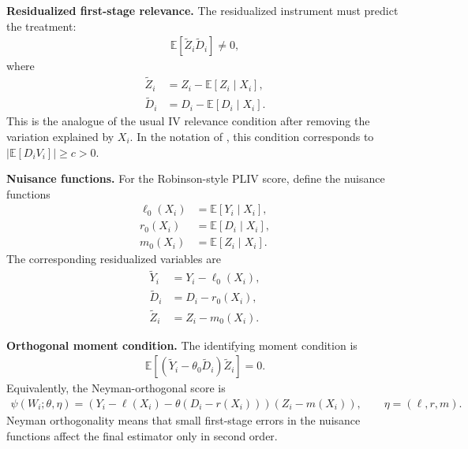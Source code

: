 \documentclass[12pt,a4paper]{article}
\begin{document}
\medskip
\noindent
\textbf{Residualized first-stage relevance.}
The residualized instrument must predict the treatment:
\begin{align}
    \mathbb{E}[\widetilde{Z}_i\widetilde{D}_i]\neq 0,
    \label{eq:pliv_residualized_first_stage}
\end{align}
where
\begin{align}
    \widetilde{Z}_i &= Z_i-\mathbb{E}[Z_i\mid X_i], \\
    \widetilde{D}_i &= D_i-\mathbb{E}[D_i\mid X_i].
\end{align}
This is the analogue of the usual IV relevance condition after removing the variation explained
by \(X_i\). In the notation of \citet{chernozhukov2018double}, this condition corresponds to
\(|\mathbb{E}[D_iV_i]|\geq c>0\).

\medskip
\noindent
\textbf{Nuisance functions.}
For the Robinson-style PLIV score, define the nuisance functions
\begin{align}
    \ell_0(X_i) &= \mathbb{E}[Y_i\mid X_i], \\
    r_0(X_i) &= \mathbb{E}[D_i\mid X_i], \\
    m_0(X_i) &= \mathbb{E}[Z_i\mid X_i].
\end{align}
The corresponding residualized variables are
\begin{align}
    \widetilde{Y}_i &= Y_i-\ell_0(X_i), \\
    \widetilde{D}_i &= D_i-r_0(X_i), \\
    \widetilde{Z}_i &= Z_i-m_0(X_i).
\end{align}

\medskip
\noindent
\textbf{Orthogonal moment condition.}
The identifying moment condition is
\begin{align}
    \mathbb{E}
    \left[
        \left(
            \widetilde{Y}_i-\theta_0\widetilde{D}_i
        \right)
        \widetilde{Z}_i
    \right]
    =0.
    \label{eq:pliv_orthogonal_moment}
\end{align}
Equivalently, the Neyman-orthogonal score is
\begin{align}
    \psi(W_i;\theta,\eta)
    =
    \left(
        Y_i-\ell(X_i)-\theta(D_i-r(X_i))
    \right)
    \left(
        Z_i-m(X_i)
    \right),
    \qquad
    \eta=(\ell,r,m).
    \label{eq:pliv_score_assumption_block}
\end{align}
Neyman orthogonality means that small first-stage errors in the nuisance functions affect the
final estimator only in second order.
\end{document}
